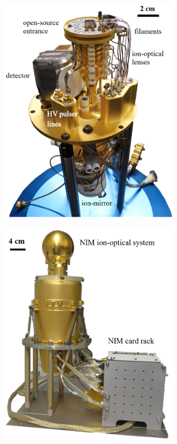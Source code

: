 	\begin{figure}[h] %
		\begin{subfigure}{0.5\textwidth}
			\centering
			\includegraphics[width =.9\textwidth]{Setup/PFM_Sensor.png}
		\end{subfigure}
		\begin{subfigure}{0.5\textwidth}
			\centering
			\includegraphics[width = \textwidth]{Setup/PFM_with_FlightEl.png}

\end{subfigure}
\end{figure}
